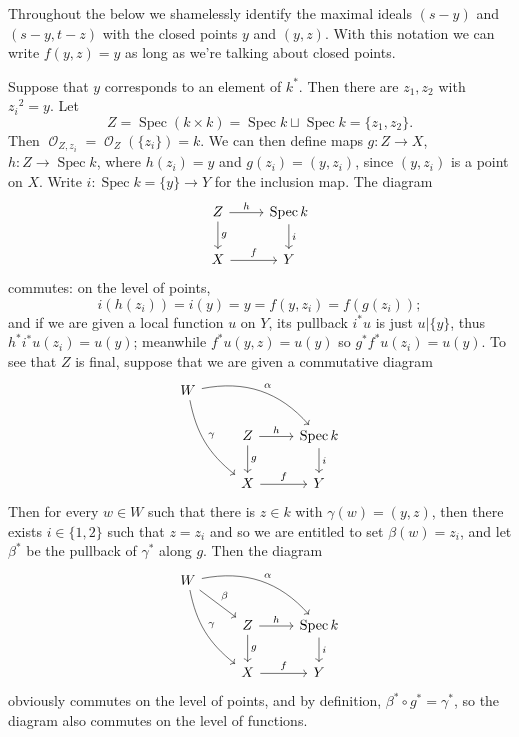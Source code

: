 \documentclass[10pt]{article}
\newcommand{\Spec}{\operatorname{Spec}}
\DeclareMathOperator{\Olo}{\mathscr O}
\theoremstyle{definition}
\begin{document}
Throughout the below we shamelessly identify the maximal ideals $(s - y)$ and $(s - y, t - z)$ with the closed points $y$ and $(y, z)$.
With this notation we can write $f(y, z) = y$ as long as we're talking about closed points.

Suppose that $y$ corresponds to an element of $k^*$.
Then there are $z_1,z_2$ with ${z_i}^2 = y$.
Let
$$Z = \Spec(k \times k) = \Spec k \sqcup \Spec k = \{z_1, z_2\}.$$
Then $\Olo_{Z,z_i} = \Olo_Z(\{z_i\}) = k$.
We can then define maps $g: Z \to X$, $h: Z \to \Spec k$, where $h(z_i) = y$ and $g(z_i) = (y, z_i)$, since $(y, z_i)$ is a point on $X$.
Write $i: \Spec k = \{y\} \to Y$ for the inclusion map.
The diagram
$$\begin{tikzcd}
Z \arrow[r, "h"] \arrow[d,"g"] & \Spec k \arrow[d,"i"] \\
X \arrow[r,"f"] & Y
\end{tikzcd}
$$
commutes: on the level of points,
$$i(h(z_i)) = i(y) = y = f(y, z_i) = f(g(z_i));$$
and if we are given a local function $u$ on $Y$, its pullback $i^* u$ is just $u|\{y\}$, thus $h^* i^* u(z_i) = u(y)$; meanwhile $f^* u(y, z) = u(y)$ so $g^* f^* u(z_i) = u(y)$.
To see that $Z$ is final, suppose that we are given a commutative diagram
$$\begin{tikzcd} W \arrow[drr,bend left=30,"\alpha"] \arrow[ddr,bend right=20,"\gamma"] \\
& Z \arrow[r,"h"] \arrow[d,"g"] & \Spec k \arrow[d,"i"] \\
& X \arrow[r,"f"] & Y\end{tikzcd}$$
Then for every $w \in W$ such that there is $z \in k$ with $\gamma(w) = (y, z)$, then there exists $i \in \{1, 2\}$ such that $z = z_i$ and so we are entitled to set $\beta(w) = z_i$, and let $\beta^*$ be the pullback of $\gamma^*$ along $g$.
Then the diagram
$$\begin{tikzcd} W \arrow[drr,bend left=30,"\alpha"] \arrow[ddr,bend right=20,"\gamma"] \arrow[dr,"\beta"] \\
& Z \arrow[r,"h"] \arrow[d,"g"] & \Spec k \arrow[d,"i"] \\
& X \arrow[r,"f"] & Y\end{tikzcd}$$
obviously commutes on the level of points, and by definition, $\beta^* \circ g^* = \gamma^*$, so the diagram also commutes on the level of functions.
\end{document}
